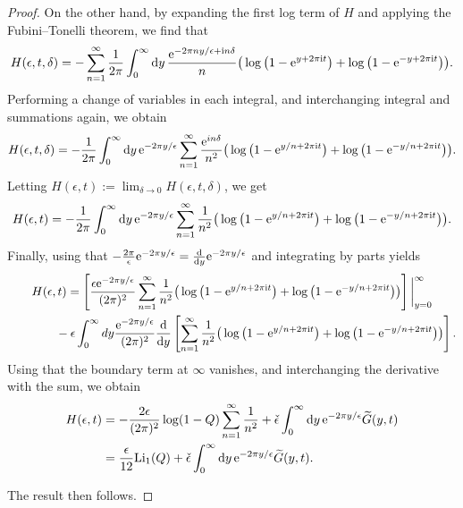 \documentclass[pdftex]{sigma}
\numberwithin{equation}{section}
\begin{document}
\begin{proof}
On the other hand, by expanding the first log term of $H$ and applying the Fubini--Tonelli theorem, we find that
\begin{equation*}
 H(\epsilon,t,\delta)
 =-\sum_{n=1}^\infty\frac{1}{2\pi }\int_{0}^{\infty}\mathrm{d}y\, \frac{{\rm e}^{-2\pi n y/\epsilon +\mathrm{i} n\delta}}{n}\big(\log\big(1-{\rm e}^{y+2\pi \mathrm{i} t}\big)+\log\big(1-{\rm e}^{-y+2\pi \mathrm{i} t}\big)\big).
\end{equation*}
Performing a change of variables in each integral, and interchanging integral and summations again, we obtain
\begin{gather*}
 H(\epsilon,t,\delta)
 =-\frac{1}{2\pi}\int_{0}^{\infty}{\rm d}y\, \mathrm{e}^{-2\pi y/\epsilon}\sum_{n=1}^\infty\frac{{\rm e}^{in\delta}} {n^2}\big( \log\big(1-{\rm e}^{y/n+2\pi \mathrm{i} t}\big)+\log\big(1-{\rm e}^{-y/n+2\pi \mathrm{i} t}\big)\big).
 \end{gather*}
Letting $H(\epsilon,t):=\lim_{\delta \to 0}H(\epsilon,t,\delta)$, we get
\begin{gather*}
H(\epsilon,t) =-\frac{1}{2\pi}\int_{0}^{\infty}{\rm d}y \, \mathrm{e}^{-2\pi y/\epsilon}\sum_{n=1}^\infty\frac{1} {n^2}\big(\log\big(1-{\rm e}^{y/n+2\pi \mathrm{i} t}\big)+\log\big(1-{\rm e}^{-y/n+2\pi \mathrm{i} t}\big)\big).
\end{gather*}
Finally, using that $-\frac{2\pi}{\epsilon}{\rm e}^{-2\pi y/\epsilon}=\frac{{\rm d}}{{\rm d}y}{\rm e}^{-2\pi y/\epsilon}$ and integrating by parts yields
\begin{gather*}
 H(\epsilon,t) =
\left[\frac{\epsilon {\rm e}^{-2\pi y/\epsilon}}{(2\pi)^2}\sum_{n=1}^\infty\frac{1} {n^2}\big(\log\big(1-{\rm e}^{y/n+2\pi \mathrm{i} t}\big)+\log\big(1-{\rm e}^{-y/n+2\pi \mathrm{i} t}\big)\big)\right]\bigg|_{y=0}^{\infty}\\
\hphantom{H(\epsilon,t) =}{}
-\epsilon\int_{0}^{\infty}dy \frac{{\rm e}^{-2\pi y/\epsilon}}{(2\pi)^2}\frac{{\rm d}}{{\rm d}y}\left[\sum_{n=1}^\infty\frac{1} {n^2}\big(\log\big(1-{\rm e}^{y/n+2\pi \mathrm{i} t}\big)+\log\big(1-{\rm e}^{-y/n+2\pi \mathrm{i} t}\big)\big)\right].
\end{gather*}
Using that the boundary term at $\infty$ vanishes, and interchanging the derivative with the sum, we obtain
\begin{align*}
H(\epsilon,t) &=-\frac{2\epsilon}{(2\pi)^2}\log(1-Q)\sum_{n=1}^{\infty}\frac{1}{n^2}+\check{\epsilon}\int_{0}^{\infty}{\rm d}y\, \mathrm{e}^{-2\pi y/\epsilon}\widetilde{G}(y,t)\\
 &=\frac{\epsilon}{12}\mathrm{Li}_1(Q)+\check{\epsilon}\int_{0}^{\infty}{\rm d}y \,\mathrm{e}^{-2\pi y/\epsilon}\widetilde{G}(y,t).
\end{align*}

The result then follows.
\end{proof}
\end{document}
